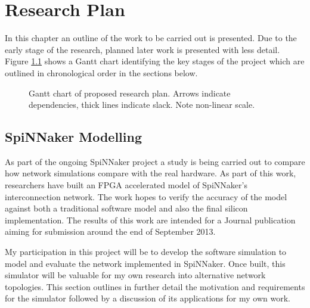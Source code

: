 \chapter{Research Plan}
	
	\label{sec:research-plan}
	
	In this chapter an outline of the work to be carried out is presented. Due to
	the early stage of the research, planned later work is presented with less
	detail.  Figure \ref{fig:plan-gantt} shows a Gantt chart identifying the key
	stages of the project which are outlined in chronological order in the
	sections below.
	
	\begin{figure}[b!]
		\center
		
		
		\caption[Research plan Gantt chart.]{Gantt chart of proposed research plan.
		Arrows indicate dependencies, thick lines indicate slack.  Note non-linear
		scale.}
		\label{fig:plan-gantt}
	\end{figure}
	
	
	\section{SpiNNaker Modelling}
		
		
		As part of the ongoing SpiNNaker project a study is being carried out to
		compare how network simulations compare with the real hardware. As part of
		this work, researchers have built an FPGA accelerated model of SpiNNaker's
		interconnection network. The work hopes to verify the accuracy of the model
		against both a traditional software model and also the final silicon
		implementation. The results of this work are intended for a Journal
		publication aiming for submission around the end of September 2013.
		
		My participation in this project will be to develop the software simulation
		to model and evaluate the network implemented in SpiNNaker. Once built, this
		simulator will be valuable for my own research into alternative network
		topologies.  This section outlines in further detail the motivation and
		requirements for the simulator followed by a discussion of its applications
		for my own work.
		
